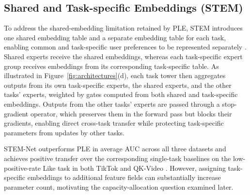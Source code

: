 \subsection{Shared and Task-specific Embeddings (STEM)}
To address the shared-embedding limitation retained by PLE, STEM introduces one shared embedding table and a separate embedding table for each task, enabling common and task-specific user preferences to be represented separately \citep{Su2024STEM}. Shared experts receive the shared embeddings, whereas each task-specific expert group receives embeddings from its corresponding task-specific table. As illustrated in Figure~\ref{fig:architectures}(d), each task tower then aggregates outputs from its own task-specific experts, the shared experts, and the other tasks' experts, weighted by gates computed from both shared and task-specific embeddings. Outputs from the other tasks' experts are passed through a stop-gradient operator, which preserves them in the forward pass but blocks their gradients, enabling direct cross-task transfer while protecting task-specific parameters from updates by other tasks.

STEM-Net outperforms PLE in average AUC across all three datasets and achieves positive transfer over the corresponding single-task baselines on the low-positive-rate Like task in both TikTok and QK-Video \citep{Su2024STEM}. However, assigning task-specific embeddings to additional feature fields can substantially increase parameter count, motivating the capacity-allocation question examined later.




